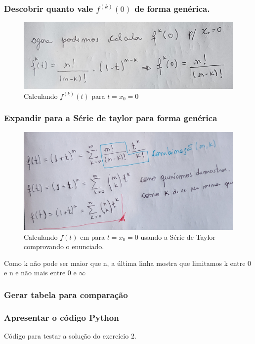 \subsubsection{Descobrir quanto vale $f^{(k)}(0)$ de forma genérica.}
\begin{figure}[H]
    \centering
    \includegraphics[width=1.0\textwidth]{imagens/exercicio2_parte2}
    \caption{Calculando $f^{(k)}(t)$ para $t = x_0 = 0$}
    \label{fig:exe2_parte2}
\end{figure}

\subsubsection{Expandir para a Série de taylor para forma genérica}
\begin{figure}[H]
    \centering
    \includegraphics[width=1.0\textwidth]{imagens/exercicio2_parte3}
    \caption{Calculando $f(t)$ em para $t = x_0 = 0$ usando a Série de Taylor comprovando o enunciado.}
    \label{fig:exe2_parte3}
\end{figure}
Como k não pode ser maior que n, a última linha mostra que limitamos k entre 0 e n e não mais entre 0 e $\infty$

\subsubsection{Gerar tabela para comparação}


\subsubsection{Apresentar o código Python}

Código para testar a solução do exercício 2.

\newpage


